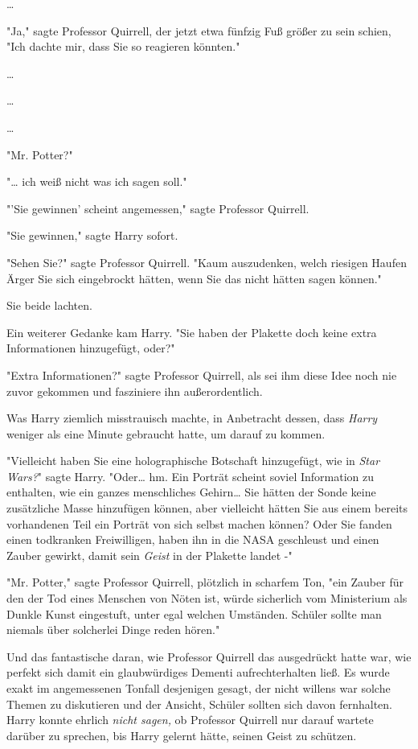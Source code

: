 {…

"Ja," sagte Professor Quirrell, der jetzt etwa fünfzig Fuß größer zu sein schien, "Ich dachte mir, dass Sie so reagieren könnten."

…

…

…

"Mr. Potter?"

"… ich weiß nicht was ich sagen soll."

"'Sie gewinnen' scheint angemessen," sagte Professor Quirrell.

"Sie gewinnen," sagte Harry sofort.

"Sehen Sie?" sagte Professor Quirrell. "Kaum auszudenken, welch riesigen Haufen Ärger Sie sich eingebrockt hätten, wenn Sie das nicht hätten sagen können."

Sie beide lachten.

Ein weiterer Gedanke kam Harry. "Sie haben der Plakette doch keine extra Informationen hinzugefügt, oder?"

"Extra Informationen?" sagte Professor Quirrell, als sei ihm diese Idee noch nie zuvor gekommen und fasziniere ihn außerordentlich.

Was Harry ziemlich misstrauisch machte, in Anbetracht dessen, dass \emph{Harry} weniger als eine Minute gebraucht hatte, um darauf zu kommen.

"Vielleicht haben Sie eine holographische Botschaft hinzugefügt, wie in \emph{Star Wars?}" sagte Harry. "Oder… hm. Ein Porträt scheint soviel Information zu enthalten, wie ein ganzes menschliches Gehirn… Sie hätten der Sonde keine zusätzliche Masse hinzufügen können, aber vielleicht hätten Sie aus einem bereits vorhandenen Teil ein Porträt von sich selbst machen können? Oder Sie fanden einen todkranken Freiwilligen, haben ihn in die NASA geschleust und einen Zauber gewirkt, damit sein \emph{Geist} in der Plakette landet -"

"Mr. Potter," sagte Professor Quirrell, plötzlich in scharfem Ton, "ein Zauber für den der Tod eines Menschen von Nöten ist, würde sicherlich vom Ministerium als Dunkle Kunst eingestuft, unter egal welchen Umständen. Schüler sollte man niemals über solcherlei Dinge reden hören."

Und das fantastische daran, wie Professor Quirrell das ausgedrückt hatte war, wie perfekt sich damit ein glaubwürdiges Dementi aufrechterhalten ließ. Es wurde exakt im angemessenen Tonfall desjenigen gesagt, der nicht willens war solche Themen zu diskutieren und der Ansicht, Schüler sollten sich davon fernhalten. Harry konnte ehrlich \emph{nicht sagen,} ob Professor Quirrell nur darauf wartete darüber zu sprechen, bis Harry gelernt hätte, seinen Geist zu schützen.

}
